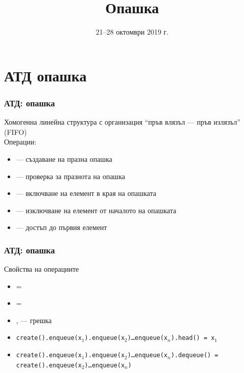 \documentclass[alsotrans]{beamerswitch}
\title{Опашка}
\date{21--28 октомври 2019 г.}
\begin{document}
\begin{frame}
  \titlepage
\end{frame}

\section{АТД опашка}

\begin{frame}
  \frametitle{АТД: опашка}

  Хомогенна линейна структура с организация ``пръв влязъл --- пръв излязъл'' (FIFO)\\[1em]
  Операции:\\[0.5em]
  \begin{itemize}
  \item {} --- създаване на празна опашка
  \item {} --- проверка за празнота на опашка
  \item {} --- включване на елемент в края на опашката
  \item {} --- изключване на елемент от началото на опашката
  \item {} --- достъп до първия елемент
  \end{itemize}
\end{frame}

\begin{frame}
  \frametitle{АТД: опашка}

  Свойства на операциите\\[0.5em]
  \small
  \begin{itemize}
  \item {} = 
  \item {} = 
  \item {},  --- \alert{грешка}
  \item \tt{create().enqueue(x$_1$).enqueue(x$_2$)\ldots{}enqueue(x$_n$).head() = x$_1$}
  \item \tt{create().enqueue(x$_1$).enqueue(x$_2$)\ldots{}enqueue(x$_n$).dequeue() = create().enqueue(x$_2$)\ldots{}enqueue(x$_n$)}
  \end{itemize}
\end{frame}
\end{document}
